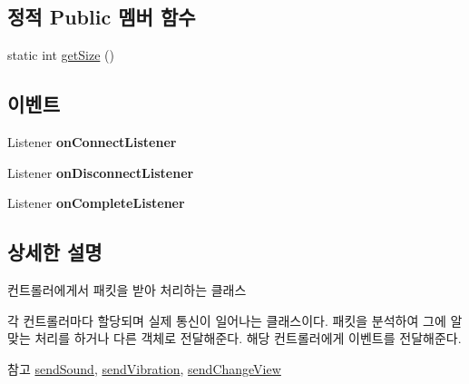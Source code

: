 \subsection*{정적 Public 멤버 함수}
\begin{DoxyCompactItemize}
\item 
static int \hyperlink{class_server_manager_1_1_g_c_packet_processor_a714bda3a3df86d6e7164866313441d6b}{get\+Size} ()
\end{DoxyCompactItemize}
\subsection*{이벤트}
\begin{DoxyCompactItemize}
\item 
\hypertarget{class_server_manager_1_1_g_c_packet_processor_aaf4f9fa7a203db3ad388adfacf453e49}{}Listener {\bfseries on\+Connect\+Listener}\label{class_server_manager_1_1_g_c_packet_processor_aaf4f9fa7a203db3ad388adfacf453e49}

\item 
\hypertarget{class_server_manager_1_1_g_c_packet_processor_a77b08a46b3f2e975423eeb8ee62b9980}{}Listener {\bfseries on\+Disconnect\+Listener}\label{class_server_manager_1_1_g_c_packet_processor_a77b08a46b3f2e975423eeb8ee62b9980}

\item 
\hypertarget{class_server_manager_1_1_g_c_packet_processor_adf20c3a863d86c5edbf1d9334d5bef32}{}Listener {\bfseries on\+Complete\+Listener}\label{class_server_manager_1_1_g_c_packet_processor_adf20c3a863d86c5edbf1d9334d5bef32}

\end{DoxyCompactItemize}


\subsection{상세한 설명}
컨트롤러에게서 패킷을 받아 처리하는 클래스

각 컨트롤러마다 할당되며 실제 통신이 일어나는 클래스이다. 패킷을 분석하여 그에 알맞는 처리를 하거나 다른 객체로 전달해준다. 해당 컨트롤러에게 이벤트를 전달해준다. \begin{DoxySeeAlso}{참고}
\hyperlink{class_server_manager_1_1_g_c_packet_processor_af10653ddaeee59e9c300a70a3780457f}{send\+Sound}, \hyperlink{class_server_manager_1_1_g_c_packet_processor_a95466c00108da09905e499103d60c8cb}{send\+Vibration}, \hyperlink{class_server_manager_1_1_g_c_packet_processor_a8baeb542bcec06b8e4f16ae7417896fb}{send\+Change\+View} 
\end{DoxySeeAlso}


